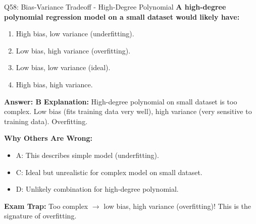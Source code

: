 \documentclass[8pt]{beamer}
\begin{document}
	\begin{frame}{Q58: Bias-Variance Tradeoff - High-Degree Polynomial}
		\fontsize{6.5}{7.5}\selectfont
		\textbf{A high-degree polynomial regression model on a small dataset would likely have:}
		
		\begin{enumerate}
			\item High bias, low variance (underfitting).
			\item Low bias, high variance (overfitting).
			\item Low bias, low variance (ideal).
			\item High bias, high variance.
		\end{enumerate}
		
		\vspace{0.05cm}
		\textcolor{myblue}{\textbf{Answer: B}}
		\vspace{0.05cm}
		\textcolor{myblue}{\textbf{Explanation:}} High-degree polynomial on small dataset is too complex. Low bias (fits training data very well), high variance (very sensitive to training data). Overfitting.
		
		\vspace{0.05cm}
		\textcolor{myred}{\textbf{Why Others Are Wrong:}}
		\begin{itemize}
			\item \textcolor{myred}{A:} This describes simple model (underfitting).
			\item \textcolor{myred}{C:} Ideal but unrealistic for complex model on small dataset.
			\item \textcolor{myred}{D:} Unlikely combination for high-degree polynomial.
		\end{itemize}
		
		\textcolor{myred}{\textbf{Exam Trap:}} Too complex $\rightarrow$ \textcolor{myblue}{low bias, high variance} (overfitting)! This is the signature of overfitting.
	\end{frame}
	
\end{document}
